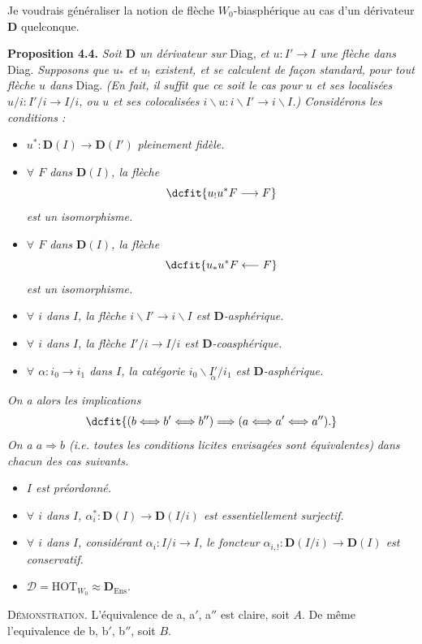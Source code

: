 \documentclass[11pt]{article}
\def\dcprintedpending{}
\newcommand{\dcjoinedprintedpage}[1]{\gdef\dcprintedpending{#1}}
\newcommand{\msp}[1]{\marginpar{\footnotesize\raggedright
  \ifx\dcprintedpending\empty\else p.~\dcprintedpending\par\fi
  [#1]}\gdef\dcprintedpending{}}
\newcommand{\bD}{\mathbf{D}}
\begin{document}
\dcjoinedprintedpage{37}
\msp{page 60}Je voudrais généraliser la notion de flèche $W_0$-biasphérique au cas d'un dérivateur $\bD$ quelconque.

\textbf{Proposition 4.4.} \textit{Soit $\bD$ un dérivateur sur} Diag, \textit{et $u : I' \longrightarrow I$ une flèche dans} Diag. \textit{Supposons que $u_*$ et $u_!$ existent, et se calculent de façon standard, pour tout flèche $u$ dans} Diag. \textit{(En fait, il suffit que ce soit le cas pour $u$ et ses localisées $u/i : I'/i \longrightarrow I/i$, ou $u$ et ses colocalisées $i\backslash u : i\backslash I' \longrightarrow i\backslash I$.) Considérons les conditions :} %
\begin{itemize}[leftmargin=4em]
\item[\textit{a)}] $u^* : \bD(I) \longrightarrow \bD(I')$ \textit{pleinement fidèle.}
\item[\textit{a$'$)}] \textit{$\forall$ $F$ dans $\bD(I)$, la flèche}
\[
\dcfit{u_!u^*F \longrightarrow F
}
\]
\textit{est un isomorphisme.}
\item[\textit{a$''$)}] \textit{$\forall$ $F$ dans $\bD(I)$, la flèche}
\[
\dcfit{u_*u^*F \longleftarrow F
}
\]
\textit{est un isomorphisme.}
\item[\textit{b)}] \textit{$\forall$ $i$ dans $I$, la flèche $i\backslash I' \longrightarrow i\backslash I$ est $\bD$-asphérique.}
\item[\textit{b$'$)}] \textit{$\forall$ $i$ dans $I$, la flèche $I'/i \longrightarrow I/i$ est $\bD$-coasphérique.}
\item[\textit{b$''$)}] \textit{$\forall$ $\alpha : i_0 \longrightarrow i_1$ dans $I$, la catégorie $i_0\backslash\underset{\alpha}{I'}/i_1$ est $\bD$-asphérique.}
\end{itemize}
\textit{On a alors les implications}
\[
\dcfit{(b \Longleftrightarrow b' \Longleftrightarrow b'') \Longrightarrow (a \Longleftrightarrow a' \Longleftrightarrow a'').
}
\]
\textit{On a $a \Longrightarrow b$ (i.e. toutes les conditions licites envisagées sont équivalentes)} \msp{page 61}\textit{dans chacun des cas suivants.}
\begin{itemize}[leftmargin=4em]
\item[$1^o$] \textit{$I$ est préordonné.}
\item[$2^o$] \textit{$\forall$ $i$ dans $I$, $\alpha_i^* : \bD(I) \longrightarrow \bD(I/i)$ est essentiellement surjectif.}
\item[$3^o$] \textit{$\forall$ $i$ dans $I$, considérant $\alpha_i : I/i \longrightarrow I$, le foncteur $\alpha_{i,!} : \bD(I/i) \longrightarrow \bD(I)$ est conservatif.}
\item[$4^o$] $\mathcal{D} = \mathrm{HOT}_{W_0} \approx \bD_{\mathrm{Ens}}$.
\end{itemize}
\textsc{Démonstration}. L'équivalence de a, a$'$, a$''$ est claire, soit $A$. De même l'equivalence de b, b$'$, b$''$, soit $B$. %
\end{document}
